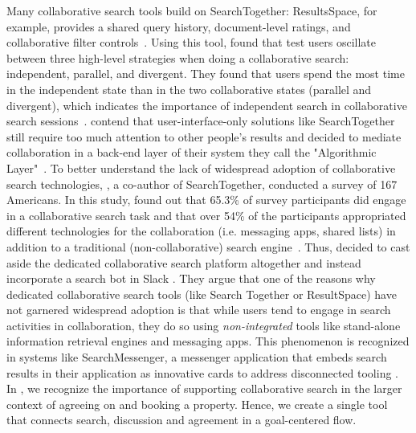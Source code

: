 Many collaborative search tools build on SearchTogether:
ResultsSpace, for example, provides a shared query history, document-level ratings, and collaborative filter controls~\cite{resultsspace}. Using this tool,  \citeauthor{resultsspace} found that test users oscillate between three high-level strategies when doing a collaborative search: independent, parallel, and divergent. They found that users spend the most time in the independent state than in the two collaborative states (parallel and divergent), which indicates the importance of independent search in collaborative search sessions~\cite{resultsspace}. \citeauthor{algorithmiccollaborativesearch} contend that user-interface-only solutions like SearchTogether still require too much attention to other people's results and decided to mediate collaboration in a back-end layer of their system they call the "Algorithmic Layer"~\cite{algorithmiccollaborativesearch}. 
To better understand the lack of widespread adoption of collaborative search technologies, \citeauthor{collaborativesearchrevisted}, a co-author of SearchTogether, conducted a survey of 167 Americans. 
In this study, \citeauthor{collaborativesearchrevisted} found out that 65.3\% of survey participants did engage in a collaborative search task and that over 54\% of the participants appropriated different technologies for the collaboration (i.e. messaging apps, shared lists) in addition to a traditional (non-collaborative) search engine~\cite{collaborativesearchrevisted}. 
Thus, \citeauthor{slacksearch} decided to cast aside the dedicated collaborative search platform altogether and instead incorporate a search bot in Slack \cite{slacksearch}. They argue that one of the reasons why dedicated collaborative search tools  (like Search Together or ResultSpace) have not garnered widespread adoption is that while users tend to engage in search activities in collaboration, they do so using \textit{non-integrated} tools like stand-alone information retrieval engines and messaging apps. This phenomenon is recognized in systems like SearchMessenger, a messenger application that embeds search results in their application as innovative cards to address disconnected tooling \cite{searchcard}. In \tool, we recognize the importance of supporting collaborative search in the larger context of agreeing on and booking a property. Hence, we create a single tool that connects search, discussion and agreement in a goal-centered flow.




 


